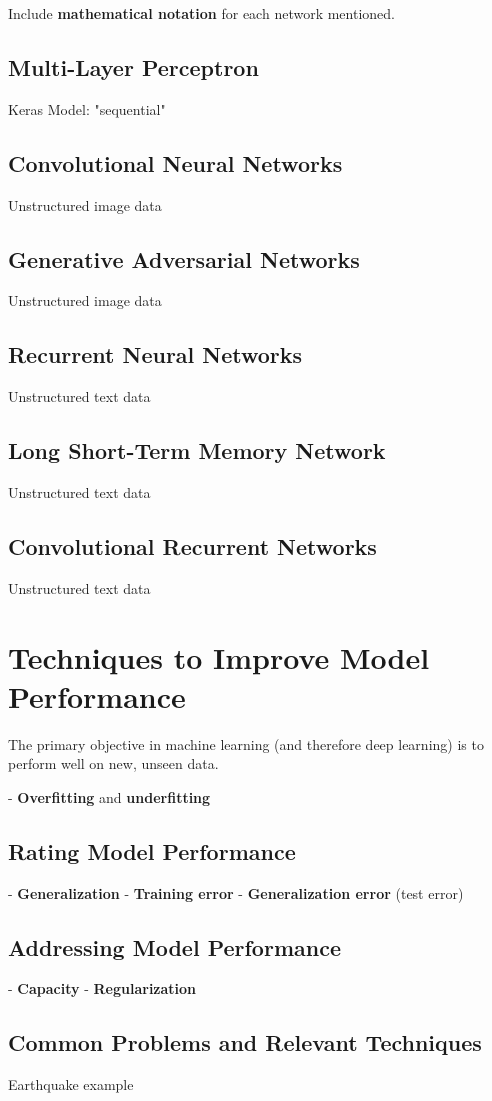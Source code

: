 Include \textbf{mathematical notation} for each network mentioned.

\subsection{Multi-Layer Perceptron}
Keras Model: "sequential"

\subsection{Convolutional Neural Networks}
Unstructured image data

\subsection{Generative Adversarial Networks}
Unstructured image data

\subsection{Recurrent Neural Networks}
Unstructured text data

\subsection{Long Short-Term Memory Network}
Unstructured text data

\subsection{Convolutional Recurrent Networks}
Unstructured text data

\section{Techniques to Improve Model Performance} %

The primary objective in machine learning (and therefore deep learning) is to perform well on new, unseen data. 

- \textbf{Overfitting} and \textbf{underfitting}

\subsection{Rating Model Performance}
- \textbf{Generalization}
- \textbf{Training error}  
- \textbf{Generalization error} (test error)

\subsection{Addressing Model Performance}
- \textbf{Capacity}
- \textbf{Regularization}

\subsection{Common Problems and Relevant Techniques}

Earthquake example